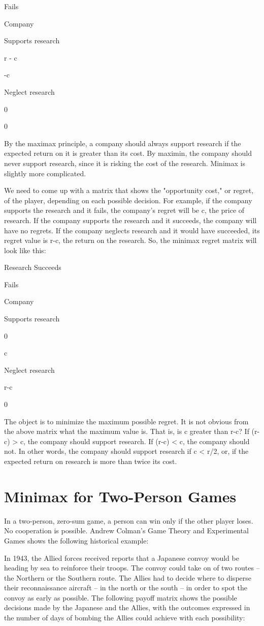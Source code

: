 \documentclass[]{report}
\begin{document}
Fails

Company

Supports research

r - c

-c

Neglect research

0

0


By the maximax principle, a company should always support research if the expected return on it is greater than its cost. By maximin, the company should never support research, since it is risking the cost of the research. Minimax is slightly more complicated.

We need to come up with a matrix that shows the "opportunity cost," or regret, of the player, depending on each possible decision. For example, if the company supports the research and it fails, the company's regret will be c, the price of research. If the company supports the research and it succeeds, the company will have no regrets. If the company neglects research and it would have succeeded, its regret value is r-c, the return on the research. So, the minimax regret matrix will look like this:

Research
Succeeds

Fails

Company

Supports research

0

c

Neglect research

r-c

0


The object is to minimize the maximum possible regret. It is not obvious from the above matrix what the maximum value is. That is, is c greater than r-c? If (r-c) > c, the company should support research. If (r-c) < c, the company should not. In other words, the company should support research if c < r/2, or, if the expected return on research is more than twice its cost.

\section{Minimax for Two-Person Games}

In a two-person, zero-sum game, a person can win only if the other player loses. No cooperation is possible. Andrew Colman's Game Theory and Experimental Games shows the following historical example:

In 1943, the Allied forces received reports that a Japanese convoy would be heading by sea to reinforce their troops. The convoy could take on of two routes -- the Northern or the Southern route. The Allies had to decide where to disperse their reconnaissance aircraft -- in the north or the south -- in order to spot the convoy as early as possible. The following payoff matrix shows the possible decisions made by the Japanese and the Allies, with the outcomes expressed in the number of days of bombing the Allies could achieve with each possibility:
\end{document}
